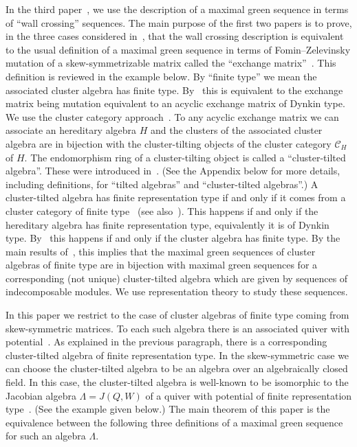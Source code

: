 \documentclass[ALCO,ThmDefs,Unicode,epreuves]{cedram}
\newcommand{\cC}{\ensuremath{{\mathcal{C}}}}
\begin{document}
In the third paper~\cite{AI}, we use the description of a maximal green sequence in terms of ``wall crossing'' sequences. The main purpose of the first two papers is to prove, in the three cases considered in~\cite{AI}, that the wall crossing description is equivalent to the usual definition of a maximal green sequence in terms of Fomin--Zelevinsky mutation of a skew-symmetrizable matrix called the ``exchange matrix''~\cite{FZ4}. This definition is reviewed in the example below. By ``finite type'' we mean the associated cluster algebra has finite type. By~\cite{FZ2} this is equivalent to the exchange matrix being mutation equivalent to an acyclic exchange matrix of Dynkin type. We use the cluster category approach~\cite{BMRRT}. To any acyclic exchange matrix we can associate an hereditary algebra $H$ and the clusters of the associated cluster algebra are in bijection with the cluster-tilting objects of the cluster category $\cC_H$ of $H$. The endomorphism ring of a cluster-tilting object is called a ``cluster-tilted algebra''. These were introduced in~\cite{BMR1}. (See the Appendix below for more details, including definitions, for ``tilted algebras'' and ``cluster-tilted algebras''.) A cluster-tilted algebra has finite representation type if and only if it comes from a cluster category of finite type~\cite{BMR3} (see also~\cite{KZ}). This happens if and only if the hereditary algebra has finite representation type, equivalently it is of Dynkin type. By~\cite{FZ2} this happens if and only if the cluster algebra has finite type. By the main results of~\cite{PartI}, this implies that the maximal green sequences of cluster algebras of finite type are in bijection with maximal green sequences for a corresponding (not unique) cluster-tilted algebra which are given by sequences of indecomposable modules. We use representation theory to study these sequences.

In this paper we restrict to the case of cluster algebras of finite type coming from skew-symmetric matrices. To each such algebra there is an associated quiver with potential~\cite{DWZ1}. As explained in the previous paragraph, there is a corresponding cluster-tilted algebra of finite representation type. In the skew-symmetric case we can choose the cluster-tilted algebra to be an algebra over an algebraically closed field. In this case, the cluster-tilted algebra is well-known to be isomorphic to the Jacobian algebra $\Lambda=J(Q,W)$ of a quiver with potential of finite representation type~\cite{BIRSm}. (See the example given below.) The main theorem of this paper is the equivalence between the following three definitions of a maximal green sequence for such an algebra $\Lambda$.
\end{document}
